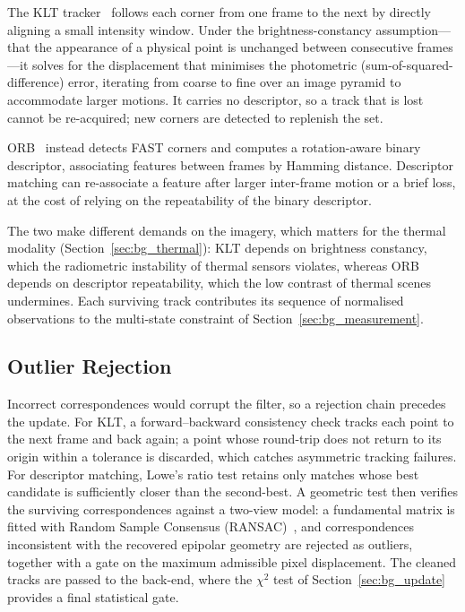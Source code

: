 The KLT tracker~\cite{Lucas_1981} follows each corner from one frame to the next by directly aligning a small intensity window. Under the brightness-constancy assumption---that the appearance of a physical point is unchanged between consecutive frames---it solves for the displacement that minimises the photometric (sum-of-squared-difference) error, iterating from coarse to fine over an image pyramid to accommodate larger motions. It carries no descriptor, so a track that is lost cannot be re-acquired; new corners are detected to replenish the set.

ORB~\cite{Rublee_2011} instead detects FAST corners and computes a rotation-aware binary descriptor, associating features between frames by Hamming distance. Descriptor matching can re-associate a feature after larger inter-frame motion or a brief loss, at the cost of relying on the repeatability of the binary descriptor.

The two make different demands on the imagery, which matters for the thermal modality (Section~\ref{sec:bg_thermal}): KLT depends on brightness constancy, which the radiometric instability of thermal sensors violates, whereas ORB depends on descriptor repeatability, which the low contrast of thermal scenes undermines. Each surviving track contributes its sequence of normalised observations to the multi-state constraint of Section~\ref{sec:bg_measurement}.

\subsection{Outlier Rejection}
\label{sec:bg_outlier}
Incorrect correspondences would corrupt the filter, so a rejection chain precedes the update. For KLT, a forward--backward consistency check tracks each point to the next frame and back again; a point whose round-trip does not return to its origin within a tolerance is discarded, which catches asymmetric tracking failures. For descriptor matching, Lowe's ratio test retains only matches whose best candidate is sufficiently closer than the second-best. A geometric test then verifies the surviving correspondences against a two-view model: a fundamental matrix is fitted with Random Sample Consensus (RANSAC)~\cite{Fischler_1981}, and correspondences inconsistent with the recovered epipolar geometry are rejected as outliers, together with a gate on the maximum admissible pixel displacement. The cleaned tracks are passed to the back-end, where the $\chi^2$ test of Section~\ref{sec:bg_update} provides a final statistical gate.

